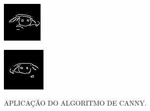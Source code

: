 \begin{figure}[h!]
    \caption{APLICAÇÃO DO ALGORITMO DE CANNY.}
    \centering
    \begin{minipage}[b]{0.45\textwidth}
        \centering
        \includegraphics[width=0.9\linewidth]{fig/03_left_eye_edge.png}
        \label{fig:canny-esquerdo}
    \end{minipage}
    \hfill
    \begin{minipage}[b]{0.45\textwidth}
        \centering
        \includegraphics[width=0.9\linewidth]{fig/03_right_eye_edge.png}
        \label{fig:canny-direito}
    \end{minipage}


\end{figure}
